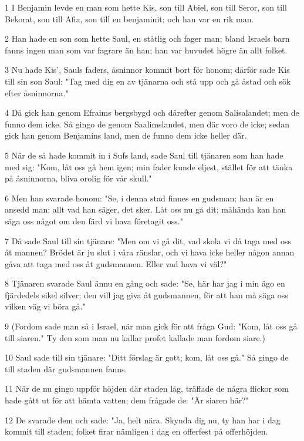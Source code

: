 \par 1 I Benjamin levde en man som hette Kis, son till Abiel, son till Seror, son till Bekorat, son till Afia, son till en benjaminit; och han var en rik man.
\par 2 Han hade en son som hette Saul, en ståtlig och fager man; bland Israels barn fanns ingen man som var fagrare än han; han var huvudet högre än allt folket.
\par 3 Nu hade Kis', Sauls faders, åsninnor kommit bort för honom; därför sade Kis till sin son Saul: "Tag med dig en av tjänarna och stå upp och gå åstad och sök efter åsninnorna."
\par 4 Då gick han genom Efraims bergsbygd och därefter genom Salisalandet; men de funno dem icke. Så gingo de genom Saalimslandet, men där voro de icke; sedan gick han genom Benjamins land, men de funno dem icke heller där.
\par 5 När de så hade kommit in i Sufs land, sade Saul till tjänaren som han hade med sig: "Kom, låt oss gå hem igen; min fader kunde eljest, stället för att tänka på åsninnorna, bliva orolig för vår skull."
\par 6 Men han svarade honom: "Se, i denna stad finnes en gudsman; han är en ansedd man; allt vad han säger, det sker. Låt oss nu gå dit; måhända kan han säga oss något om den färd vi hava företagit oss."
\par 7 Då sade Saul till sin tjänare: "Men om vi gå dit, vad skola vi då taga med oss åt mannen? Brödet är ju slut i våra ränslar, och vi hava icke heller någon annan gåva att taga med oss åt gudsmannen. Eller vad hava vi väl?"
\par 8 Tjänaren svarade Saul ännu en gång och sade: "Se, här har jag i min ägo en fjärdedels sikel silver; den vill jag giva åt gudsmannen, för att han må säga oss vilken väg vi böra gå."
\par 9 (Fordom sade man så i Israel, när man gick för att fråga Gud: "Kom, låt oss gå till siaren." Ty den som man nu kallar profet kallade man fordom siare.)
\par 10 Saul sade till sin tjänare: "Ditt förslag är gott; kom, låt oss gå." Så gingo de till staden där gudsmannen fanns.
\par 11 När de nu gingo uppför höjden där staden låg, träffade de några flickor som hade gått ut för att hämta vatten; dem frågade de: "Är siaren här?"
\par 12 De svarade dem och sade: "Ja, helt nära. Skynda dig nu, ty han har i dag kommit till staden; folket firar nämligen i dag en offerfest på offerhöjden.
